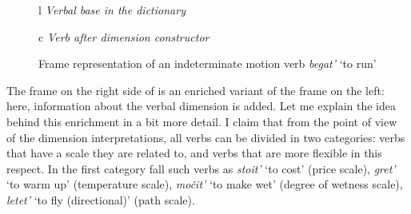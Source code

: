 \begin{figure}
\begin{tabular}[t]{l}
\textit{Verbal base in the dictionary}\\
\end{tabular}
\hfill
\begin{tabular}[t]{c}
\textit{Verb after dimension constructor}\\
\end{tabular}
\caption{Frame representation of an indeterminate motion verb \textit{begat'} `to run' \label{frame:begat}}
\end{figure}

The frame on the right side of  is an enriched variant of the frame on the left: here, information about the verbal dimension is added. Let me explain the idea behind this enrichment in a bit more detail. I claim that from the point of view of the dimension interpretations, all verbs can be divided in two categories: verbs that have a scale they are related to, and verbs that are more flexible in this respect. In the first category fall such verbs as \textit{stoit'} `to cost' (price scale), \textit{gret'} `to warm up' (temperature scale), \textit{mo\v{c}it'} `to make wet' (degree of wetness scale), \textit{letet'} `to fly (directional)' (path scale). 



